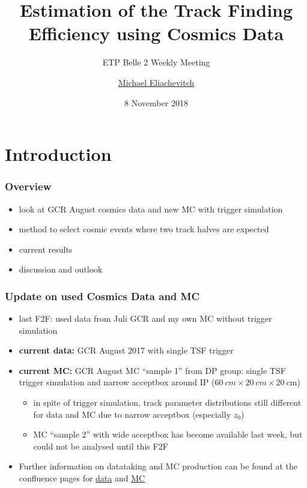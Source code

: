 \documentclass[18pt]{beamer}
\title{Estimation of the Track Finding Efficiency using Cosmics Data}
\subtitle{ETP Belle 2 Weekly Meeting}
\author{\underline{Michael Eliachevitch}}
\date{8 November 2018}
\institute{ETP -- KIT}
\begin{document}

\section{Introduction}
\begin{frame}
  \titlepage
\end{frame}

\begin{frame}
  \frametitle{Overview}
  \begin{itemize}
  \item look at GCR August cosmics data and new MC with trigger simulation
  \item method to select cosmic events where two track halves are expected
  \item current results 
  \item discussion and outlook
  \end{itemize}
\end{frame}

\begin{frame}
  \frametitle{Update on used Cosmics Data and MC}
  \begin{itemize}
  \item last F2F: used data from Juli GCR and my own MC without trigger simulation
  \item \textbf{current data:} GCR August 2017  with single TSF trigger
  \item \textbf{current MC:} GCR August MC ``sample 1'' from DP group: single TSF trigger simulation and narrow acceptbox around IP ($\SI{60}{cm} \times \SI{20}{cm} \times \SI{20}{\cm}$)
    \begin{itemize}
    \item in spite of trigger simulation, track parameter distributions still different  for data and MC due to narrow acceptbox (especially $z_0$)
    \item MC ``sample 2'' with wide acceptbox has become available last week, but could not be analysed until this F2F
    \end{itemize}
  \item Further information on datataking and MC production can be found at the confluence pages for
    \href{https://confluence.desy.de/display/BI/Data+Production+Global+Cosmics+Run+Data\#DataProductionGlobalCosmicsRunData-Runinfo}{data}
    and \href{https://confluence.desy.de/display/BI/Data+Production+Global+Cosmics+Run+MC}{MC}
  \end{itemize}    
\end{frame}
\end{document}
